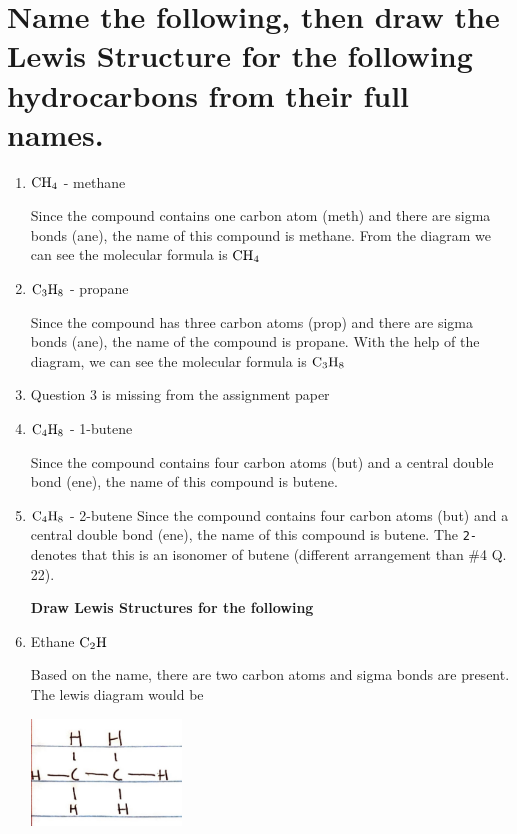 \documentclass{scrartcl}
\begin{document}
\section{Name the following, then draw the Lewis Structure for the following hydrocarbons from their full names.}
\label{sec:org87b99fd}
\begin{enumerate}
\item \(\ce{CH4}\) - methane

Since the compound contains one carbon atom (meth) and there are sigma bonds
(ane), the name of this compound is methane. From the diagram we can see the
molecular formula is    \(\ce{CH4}\)

\item \(\ce{C3H8}\) - propane

Since the compound has three carbon atoms (prop) and there are sigma bonds
(ane), the name of the compound is propane. With the help of the diagram, we
can see the molecular formula is    \(\ce{C3H8}\)

\item Question 3 is missing from the assignment paper

\item \(\ce{C4H8}\) - 1-butene

Since the compound contains four carbon atoms (but) and a central double bond
(ene), the name of this compound is butene.

\item \(\ce{C4H8}\) - 2-butene
Since the compound contains four carbon atoms (but) and a central double bond
(ene), the name of this compound is butene. The \texttt{2-} denotes that this is an
isonomer of butene (different arrangement than \#4 Q. 22).

\textbf{Draw Lewis Structures for the following}

\item Ethane \(\ce{C2H}\)

Based on the name, there are two carbon atoms and sigma bonds are present.
The lewis diagram would be

\begin{center}
\includegraphics[width=4cm]{./images/6.JPG}
\end{center}


\end{enumerate}
\end{document}
